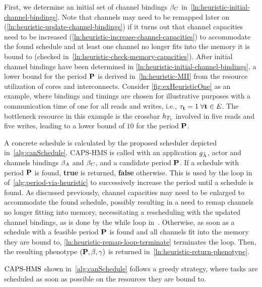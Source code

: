 First, we determine an initial set of channel bindings $\beta_C$ in~\cref{ln:heuristic-initial-channel-bindings}.
Note that channels may need to be remapped later on (\cref{ln:heuristic-update-channel-bindings}) if it turns out that channel capacities need to be increased (\cref{ln:heuristic-increase-channel-capacities}) to accommodate the found schedule and at least one channel no longer fits into the memory it is bound to (checked in~\cref{ln:heuristic-check-memory-capacities}).
After initial channel bindings have been determined in \cref{ln:heuristic-initial-channel-bindings}, a lower bound for the period $\mathbf{P}$ is derived in~\cref{ln:heuristic-MII} from the resource utilization of cores and interconnects.
Consider \cref{fig:exHeuristicOne} as an example, where bindings and timings are chosen for illustrative purposes with a communication time of one for all reads and writes, i.e., $\tau_{\mathbf{t}} = 1\;\forall \mathbf{t} \in E$.
The bottleneck resource in this example is the crossbar ${h_{T_{1}}}$ involved in five reads and five writes, leading to a lower bound of $10$ for the period $\mathbf{P}$.
\par
A concrete schedule is calculated by the proposed scheduler  depicted in~\cref{alg:canSchedule}.
\ac{CAPS-HMS} is called with an application $g_{\tilde{\textrm{A}}}$, actor and channels bindings $\beta_A$ and $\beta_C$, and a candidate period $\mathbf{P}$.
If a schedule with period $\mathbf{P}$ is found, \textbf{true} is returned, \textbf{false} otherwise.
This is used by the loop in~ of~\cref{alg:period-via-heuristic} to successively increase the period until a schedule is found.
As discussed previously, channel capacities may need to be enlarged to accommodate the found schedule, possibly resulting in a need to remap channels no longer fitting into memory, necessitating a rescheduling with the updated channel bindings, as is done by the while loop in~.
Otherwise, as soon as a schedule with a feasible period $\mathbf{P}$ is found and all channels fit into the memory they are bound to, \cref{ln:heuristic-remap-loop-terminate} terminates the loop.
Then, the resulting phenotype $(\mathbf{P}, \beta, \gamma)$ is returned in~\cref{ln:heuristic-return-phenotype}.
\par
$\textup{CAPS-HMS}$ shown in~\cref{alg:canSchedule} follows a greedy strategy, where tasks are scheduled as soon as possible on the resources they are bound to.
